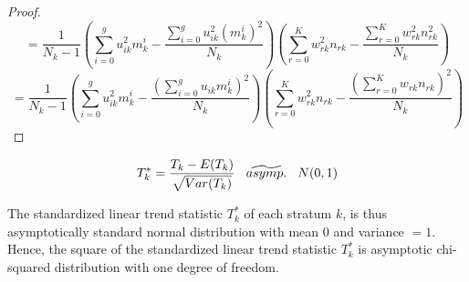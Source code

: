 \documentclass[12pt,oneside]{report}
\theoremstyle{definition}
\theoremstyle{mystyle}
\begin{document}
\begin{proof}
	\vspace{4mm}
	\begin{equation*}
	=\displaystyle\frac{1}{N_{k}-1}\left(\sum\limits_{i=0}^{g}u_{ik}^2m_{k}^{i}-\frac{\sum\limits_{i=0}^{g}u_{ik}^2(m_{k}^{i})^2}{N_{k}}\right)\left(\sum\limits_{r=0}^{K}w_{rk}^2n_{rk}-\frac{\sum\limits_{r=0}^{K}w_{rk}^2n_{rk}^2}{N_{k}}\right)
	\end{equation*}
	\vspace{4mm}
	\begin{equation*}
	=\displaystyle\frac{1}{N_{k}-1}\left(\sum\limits_{i=0}^{g}u_{ik}^2m_{k}^{i}-\frac{\left(\sum\limits_{i=0}^{g}u_{ik}m_{k}^{i}\right)^2}{N_{k}}\right)\left(\sum\limits_{r=0}^{K}w_{rk}^2n_{rk}-\frac{\left(\sum\limits_{r=0}^{K}w_{rk}n_{rk}\right)^2}{N_{k}}\right)
	\end{equation*}
\end{proof}


\begin{equation*}
T_{k}^{*}=\displaystyle\frac{T_{k}-E(T_{k})}{\sqrt{Var(T_{k})}}\hspace{3mm} \widetilde{asymp.} \hspace{3mm}N(0,1) 
\end{equation*}

\vspace{5mm}

The standardized linear trend statistic $T_{k}^{*}$ of each stratum $k$, is thus asymptotically standard normal distribution with mean $0$ and variance $=1$. Hence, the  square of the standardized linear trend statistic $T_{k}^{*}$ is asymptotic chi-squared distribution with one degree of freedom. 
\end{document}
